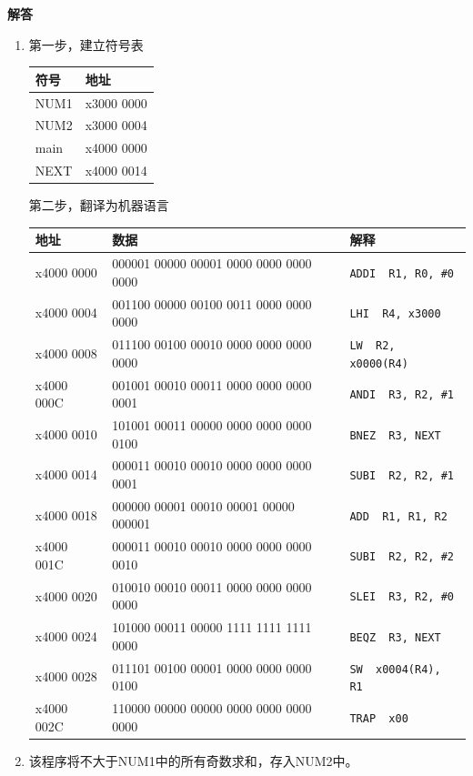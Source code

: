 \documentclass[10pt,a4paper,UTF8]{ctexart}
\newenvironment{solution}{\par\noindent\textbf{解答}\ }{\par}
\begin{document}
\begin{solution}
	\begin{enumerate}[(1)]
		\item 第一步，建立符号表
		\begin{table}[H]
		\centering
			\begin{tabular}{|l|l|}
			\hline
			符号   & 地址         \\ \hline
			NUM1 & x3000 0000 \\ \hline
			NUM2 & x3000 0004 \\ \hline
			main & x4000 0000 \\ \hline
			NEXT & x4000 0014 \\ \hline
			\end{tabular}
			\end{table}
		
		第二步，翻译为机器语言
		\begin{table}[H]
		\centering
			\begin{tabular}{|l|l|l|}
			\hline
			地址         & 数据                                       & 解释               \\ \hline
			x4000 0000 & 000001 00000 00001 0000 0000 0000 0000 & \verb|ADDI  R1, R0, #0| \\ \hline
			x4000 0004 & 001100 00000 00100 0011 0000 0000 0000 & \verb|LHI  R4, x3000|    \\ \hline
			x4000 0008 & 011100 00100 00010 0000 0000 0000 0000 & \verb|LW  R2, x0000(R4)| \\ \hline
			x4000 000C & 001001 00010 00011 0000 0000 0000 0001 & \verb|ANDI  R3, R2, #1| \\ \hline
			x4000 0010 & 101001 00011 00000 0000 0000 0000 0100 & \verb|BNEZ  R3, NEXT|    \\ \hline
			x4000 0014 & 000011 00010 00010 0000 0000 0000 0001 & \verb|SUBI  R2, R2, #1| \\ \hline
			x4000 0018 & 000000 00001 00010 00001 00000 000001  & \verb|ADD  R1, R1, R2|   \\ \hline
			x4000 001C & 000011 00010 00010 0000 0000 0000 0010 & \verb|SUBI  R2, R2, #2| \\ \hline
			x4000 0020 & 010010 00010 00011 0000 0000 0000 0000 & \verb|SLEI  R3, R2, #0| \\ \hline
			x4000 0024 & 101000 00011 00000 1111 1111 1111 0000 & \verb|BEQZ  R3, NEXT|    \\ \hline
			x4000 0028 & 011101 00100 00001 0000 0000 0000 0100 & \verb|SW  x0004(R4), R1| \\ \hline
			x4000 002C & 110000 00000 00000 0000 0000 0000 0000 & \verb|TRAP  x00|         \\ \hline
			\end{tabular}
			\end{table}
		\item 该程序将不大于NUM1中的所有奇数求和，存入NUM2中。
	\end{enumerate}

\end{solution}
\end{document}
